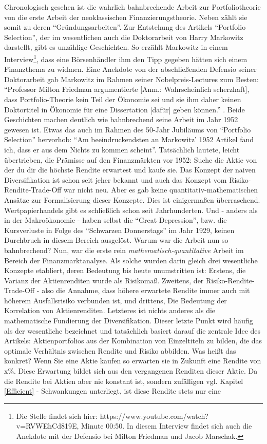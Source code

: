 Chronologisch gesehen ist die wahrlich bahnbrechende Arbeit zur Portfoliotheorie von \textcite{Markowitz1952} die erste Arbeit der neoklassischen Finanzierungstheorie. Neben \textcite{Modigliani1958} zählt sie somit zu deren "`Gründungsarbeiten"'. Zur Entstehung des Artikels "`Portfolio Selection"', der im wesentlichen auch die Doktorarbeit von Harry Markowitz darstellt, gibt es unzählige Geschichten. So erzählt Markowitz in einem Interview\footnote{Die Stelle findet sich hier: https://www.youtube.com/watch?v=RVWEhCd819E, Minute 00:50. In diesem Interview findet sich auch die Anekdote mit der Defensio bei Milton Friedman und  Jacob Marschak.}, dass eine Börsenhändler ihm den Tipp gegeben hätten sich einem Finanzthema zu widmen. Eine Anekdote von der abschließenden Defensio seiner Doktorarbeit gab Markowitz im Rahmen seiner Nobelpreis-Lectures zum Besten: "`Professor Milton Friedman argumentierte [Anm.: Wahrscheinlich scherzhaft], dass Portfolio-Theorie kein Teil der Ökonomie sei und sie ihm daher keinen Doktortitel in Ökonomie für eine Dissertation [dafür] geben können."' \parencite[S. 286]{Markowitz1990}. Beide Geschichten machen deutlich wie bahnbrechend seine Arbeit im Jahr 1952 gewesen ist. Etwas das auch \textcite{Rubinstein2002} im Rahmen des 50-Jahr Jubiläums von "`Portfolio Selection"' hervorhob: "`Am beeindruckendsten an Markowitz' 1952 Artikel fand ich, dass er aus dem Nichts zu kommen scheint"'. Tatsächlich lautete, leicht übertrieben, die Prämisse auf den Finanzmärkten vor 1952: Suche die Aktie von der du dir die höchste Rendite erwartest und kaufe sie. Das Konzept der naiven Diversifikation ist schon seit jeher bekannt und auch das Konzept vom Risiko-Rendite-Trade-Off war nicht neu. Aber es gab keine quantitativ-mathematischen Ansätze zur Formalisierung dieser Konzepte. Dies ist einigermaßen überraschend. Wertpapierhandels gibt es schließlich schon seit Jahrhunderten.  Und - anders als in der Makroökonomie - haben selbst die "`Great Depression"', bzw. die Kursverluste in Folge des "`Schwarzen Donnerstags"' im Jahr 1929, keinen Durchbruch in diesem Bereich ausgelöst. Warum war die Arbeit nun so bahnbrechend? Nun, \textcite{Markowitz1952} war die erste rein \textit{mathematisch-quantitative} Arbeit im Bereich der Finanzmarktanalyse. Als solche wurden darin gleich drei wesentliche Konzepte etabliert, deren Bedeutung bis heute unumstritten ist: Erstens, die Varianz der Aktienrenditen wurde als Risikomaß. Zweitens, der Risiko-Rendite-Trade-Off - also die Annahme, dass höhere erwartete Rendite immer auch mit höherem Ausfallsrisiko verbunden ist, und drittens, Die Bedeutung der Korrelation von Aktienrenditen. Letzteres ist nichts anderes als die mathematische Fundierung der Diversifikation. Dieser letzte Punkt wird häufig als der wesentliche bezeichnet und tatsächlich basiert darauf die zentrale Idee des Artikels: Aktienportfolios aus der Kombination von Einzeltiteln zu bilden, die das optimale Verhältnis zwischen Rendite und Risiko abbilden. Was heißt das konkret? Wenn Sie eine Aktie kaufen so erwarten sie in Zukunft eine Rendite von x\%. Diese Erwartung bildet sich aus den vergangenen Renditen dieser Aktie. Da die Rendite bei Aktien aber nie konstant ist, sondern zufälligen vgl. Kapitel \ref{Efficient} - Schwankungen unterliegt, ist diese Rendite stets nur eine 